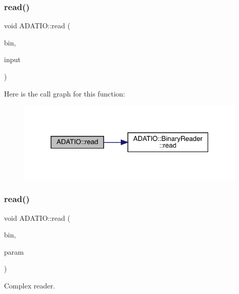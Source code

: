\subsubsection{\texorpdfstring{read()}{read()}\hspace{0.1cm}{\footnotesize\ttfamily [13/28]}}
{\footnotesize\ttfamily void A\+D\+A\+T\+I\+O\+::read (\begin{DoxyParamCaption}\item[{\mbox{\hyperlink{classADATIO_1_1BinaryReader}{Binary\+Reader}} \&}]{bin,  }\item[{bool \&}]{input }\end{DoxyParamCaption})}

Here is the call graph for this function\+:
\nopagebreak
\begin{figure}[H]
\begin{center}
\leavevmode
\includegraphics[width=313pt]{d0/dba/namespaceADATIO_a5f367e2dbd4baac46c87c566b42ce4ce_cgraph}
\end{center}
\end{figure}
\mbox{\label{namespaceADATIO_aa439c7d6dfc63d8424816de24810141d}} 
\subsubsection{\texorpdfstring{read()}{read()}\hspace{0.1cm}{\footnotesize\ttfamily [14/28]}}
{\footnotesize\ttfamily void A\+D\+A\+T\+I\+O\+::read (\begin{DoxyParamCaption}\item[{\mbox{\hyperlink{classADATIO_1_1BinaryReader}{Binary\+Reader}} \&}]{bin,  }\item[{std\+::complex$<$ float $>$ \&}]{param }\end{DoxyParamCaption})}



Complex reader. 


